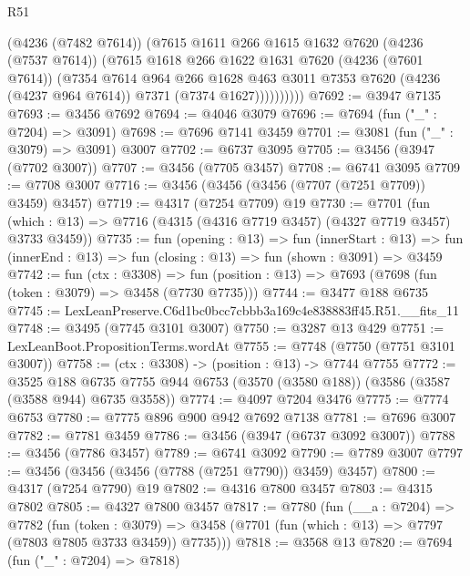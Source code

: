 \begin{lexlean}{R51}
\begin{coremodule}
                (@4236 (@7482 @7614))
                (@7615
                  @1611
                  @266
                  @1615
                  @1632
                  @7620
                  (@4236 (@7537 @7614))
                  (@7615
                    @1618
                    @266
                    @1622
                    @1631
                    @7620
                    (@4236 (@7601 @7614))
                    (@7354
                      @7614
                      @964
                      @266
                      @1628
                      @463
                      @3011
                      @7353
                      @7620
                      (@4236 (@4237 @964 @7614))
                      @7371
                      (@7374 @1627))))))))))
@7692 := @3947 @7135
@7693 := @3456 @7692
@7694 := @4046 @3079
@7696 := @7694 (fun ("_" : @7204) => @3091)
@7698 := @7696 @7141 @3459
@7701 := @3081 (fun ("_" : @3079) => @3091) @3007
@7702 := @6737 @3095
@7705 := @3456 (@3947 (@7702 @3007))
@7707 := @3456 (@7705 @3457)
@7708 := @6741 @3095
@7709 := @7708 @3007
@7716 := @3456 (@3456 (@3456 (@7707 (@7251 @7709)) @3459) @3457)
@7719 := @4317 (@7254 @7709) @19
@7730 := @7701
    (fun (which : @13) => @7716 (@4315 (@4316 @7719 @3457) (@4327 @7719 @3457) @3733 @3459))
@7735 := fun (opening : @13) =>
  fun (innerStart : @13) =>
  fun (innerEnd : @13) => fun (closing : @13) => fun (shown : @3091) => @3459
@7742 := fun (ctx : @3308) =>
  fun (position : @13) => @7693 (@7698 (fun (token : @3079) => @3458 (@7730 @7735)))
@7744 := @3477 @188 @6735
@7745 := LexLeanPreserve.C6d1bc0bcc7cbbb3a169c4e838883ff45.R51.__fits_11
@7748 := @3495 (@7745 @3101 @3007)
@7750 := @3287 @13 @429
@7751 := LexLeanBoot.PropositionTerms.wordAt
@7755 := @7748 (@7750 (@7751 @3101 @3007))
@7758 := (ctx : @3308) -> (position : @13) -> @7744 @7755
@7772 := @3525
    @188
    @6735
    @7755
    @944
    @6753
    (@3570 (@3580 @188))
    (@3586 (@3587 (@3588 @944) @6735 @3558))
@7774 := @4097 @7204 @3476
@7775 := @7774 @6753
@7780 := @7775 @896 @900 @942 @7692 @7138
@7781 := @7696 @3007
@7782 := @7781 @3459
@7786 := @3456 (@3947 (@6737 @3092 @3007))
@7788 := @3456 (@7786 @3457)
@7789 := @6741 @3092
@7790 := @7789 @3007
@7797 := @3456 (@3456 (@3456 (@7788 (@7251 @7790)) @3459) @3457)
@7800 := @4317 (@7254 @7790) @19
@7802 := @4316 @7800 @3457
@7803 := @4315 @7802
@7805 := @4327 @7800 @3457
@7817 := @7780
    (fun (__a : @7204) =>
    @7782
      (fun (token : @3079) =>
      @3458 (@7701 (fun (which : @13) => @7797 (@7803 @7805 @3733 @3459)) @7735)))
@7818 := @3568 @13
@7820 := @7694 (fun ("_" : @7204) => @7818)

\end{coremodule}
\end{lexlean}
